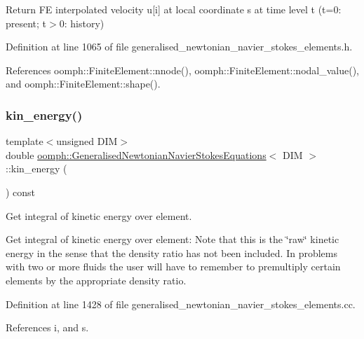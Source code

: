 Return FE interpolated velocity u\mbox{[}i\mbox{]} at local coordinate s at time level t (t=0\+: present; t$>$0\+: history) 



Definition at line 1065 of file generalised\+\_\+newtonian\+\_\+navier\+\_\+stokes\+\_\+elements.\+h.



References oomph\+::\+Finite\+Element\+::nnode(), oomph\+::\+Finite\+Element\+::nodal\+\_\+value(), and oomph\+::\+Finite\+Element\+::shape().

\mbox{\label{classoomph_1_1GeneralisedNewtonianNavierStokesEquations_acd047d8c839e7145fa54f862f8642fd9}} 
\subsubsection{\texorpdfstring{kin\+\_\+energy()}{kin\_energy()}}
{\footnotesize\ttfamily template$<$unsigned D\+IM$>$ \\
double \hyperlink{classoomph_1_1GeneralisedNewtonianNavierStokesEquations}{oomph\+::\+Generalised\+Newtonian\+Navier\+Stokes\+Equations}$<$ D\+IM $>$\+::kin\+\_\+energy (\begin{DoxyParamCaption}{ }\end{DoxyParamCaption}) const}



Get integral of kinetic energy over element. 

Get integral of kinetic energy over element\+: Note that this is the \char`\"{}raw\char`\"{} kinetic energy in the sense that the density ratio has not been included. In problems with two or more fluids the user will have to remember to premultiply certain elements by the appropriate density ratio. 

Definition at line 1428 of file generalised\+\_\+newtonian\+\_\+navier\+\_\+stokes\+\_\+elements.\+cc.



References i, and s.

\mbox{\label{classoomph_1_1GeneralisedNewtonianNavierStokesEquations_a21c779dd47121dafefa537004f508d76}} 
